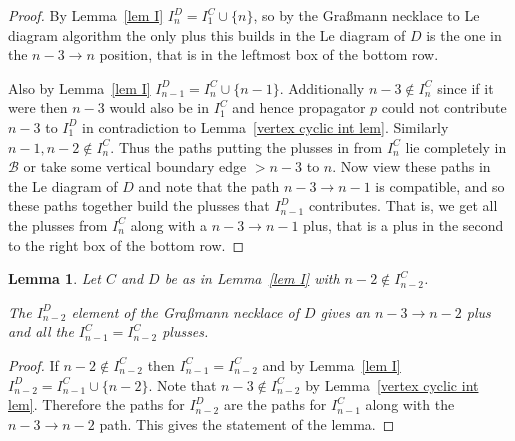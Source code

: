 \documentclass[11pt]{article}
\newtheorem{lem}[thm]{Lemma}
\theoremstyle{remark}
\theoremstyle{definition}
\begin{document}
\begin{proof}
  By Lemma~\ref{lem I} $I_n^{D}= I_1^{C} \cup \{n\}$, so by the Gra\ss mann necklace to Le diagram algorithm the only plus this builds in the Le diagram of $D$ is  the one in the $n-3\rightarrow n$ position, that is in the leftmost box of the bottom row.

  Also by Lemma~\ref{lem I} $I_{n-1}^{D} = I_n^{C} \cup \{n-1\}$.  Additionally $n-3\not\in I_{n}^{C}$ since if it were then $n-3$ would also be in $I_1^{C}$ and hence propagator $p$ could not contribute $n-3$ to $I_1^{D}$ in contradiction to Lemma~\ref{vertex cyclic int lem}.  Similarly $n-1, n-2\not\in I_n^{C}$.  Thus the paths putting the plusses in from $I_n^{C}$ lie completely in $\mathcal{B}$ or take some vertical boundary edge $>n-3$ to $n$.   Now view these paths in the Le diagram of $D$ and note that the path $n-3\rightarrow n-1$ is compatible, and so these paths together build the plusses that $I_{n-1}^{D}$ contributes.  That is, we get all the plusses from $I_{n}^{C}$ along with a $n-3\rightarrow n-1$ plus, that is a plus in the second to the right box of the bottom row.
\end{proof}

\begin{lem}\label{lem n-2 good}
  Let $C$ and $D$ be as in Lemma~\ref{lem I} with $n-2 \not\in I_{n-2}^{C}$.

  The $I_{n-2}^{D}$ element of the Gra\ss mann necklace of $D$ gives
  an $n-3\rightarrow n-2$ plus and
  all the $I_{n-1}^{C}=I_{n-2}^{C}$ plusses.
\end{lem}

\begin{proof}
  If $n-2\not\in I_{n-2}^{C}$ then $I_{n-1}^{C}=I_{n-2}^{C}$ and by Lemma~\ref{lem I} $I_{n-2}^{D} = I_{n-1}^{C} \cup \{n-2\}$.  Note that $n-3\not\in I_{n-2}^{C}$ by Lemma~\ref{vertex cyclic int lem}.  Therefore the paths for $I_{n-2}^{D}$ are the paths for $I_{n-1}^{C}$ along with the $n-3\rightarrow n-2$ path.  This gives the statement of the lemma.

\end{proof}
\end{document}
